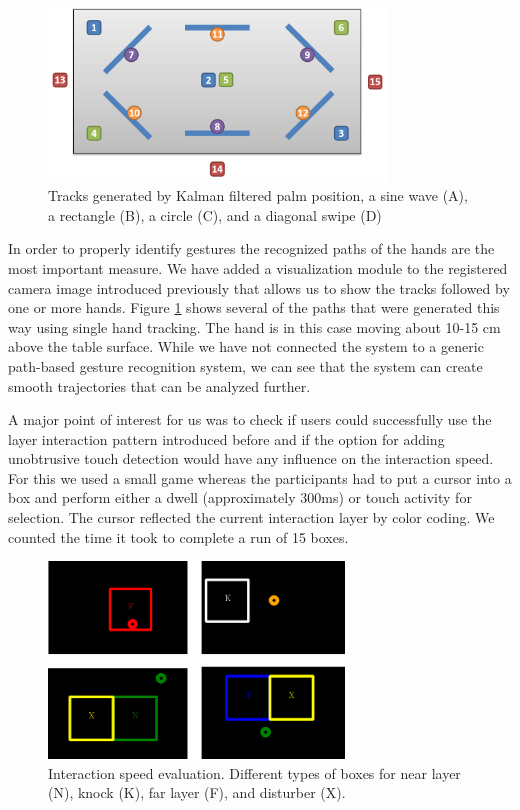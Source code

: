 \begin{figure}[ht]
\centering
\includegraphics[width=0.8\textwidth]{images/knock_points}
\caption{Tracks generated by Kalman filtered palm position, a sine wave (A), a rectangle (B), a circle (C), and a diagonal swipe (D)}
\label{fig:tracks}
\end{figure}

In order to properly identify gestures the recognized paths of the hands are the most important measure. We have added a visualization module to the registered camera image introduced previously that allows us to show the tracks followed by one or more hands. Figure \ref{fig:tracks} shows several of the paths that were generated this way using single hand tracking. The hand is in this case moving about 10-15 cm above the table surface. While we have not connected the system to a generic path-based gesture recognition system, we can see that the system can create smooth trajectories that can be analyzed further.

A major point of interest for us was to check if users could successfully use the layer interaction pattern introduced before and if the option for adding unobtrusive touch detection would have any influence on the interaction speed. For this we used a small game whereas the participants had to put a cursor into a box and perform either a dwell (approximately 300ms) or touch activity for selection. The cursor reflected the current interaction layer by color coding. We counted the time it took to complete a run of 15 boxes.

\begin{figure}[ht]
\centering
\includegraphics[width=0.7\textwidth]{images/eval_speed}
\caption{Interaction speed evaluation. Different types of boxes for near layer (N), knock (K), far layer (F), and disturber (X).}
\label{fig:eval_speed}
\end{figure}

